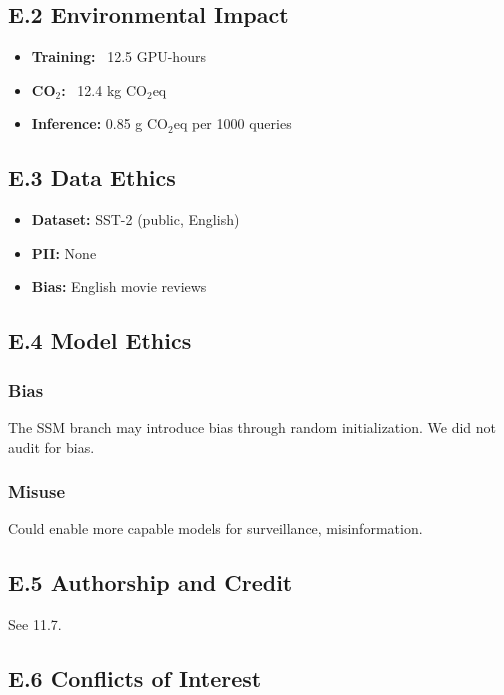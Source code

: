 \subsection{E.2 Environmental Impact}

\begin{itemize}
\item \textbf{Training:} ~12.5 GPU-hours
\item \textbf{CO$_2$:} ~12.4 kg CO$_2$eq
\item \textbf{Inference:} 0.85 g CO$_2$eq per 1000 queries

\end{itemize}
\subsection{E.3 Data Ethics}

\begin{itemize}
\item \textbf{Dataset:} SST-2 (public, English)
\item \textbf{PII:} None
\item \textbf{Bias:} English movie reviews

\end{itemize}
\subsection{E.4 Model Ethics}

\subsubsection{Bias}

The SSM branch may introduce bias through random initialization. We did 
not audit for bias.

\subsubsection{Misuse}

Could enable more capable models for surveillance, misinformation.

\subsection{E.5 Authorship and Credit}

See  11.7.

\subsection{E.6 Conflicts of Interest}

